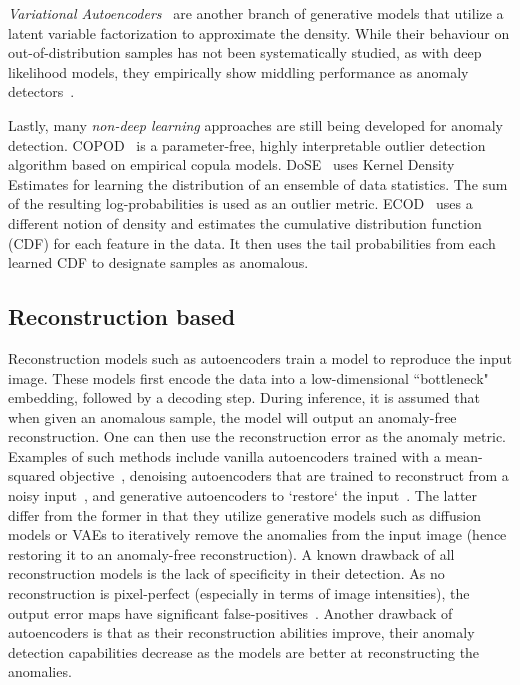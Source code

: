 \textit{Variational Autoencoders}~\cite{kingma2013auto} are another branch of generative models that utilize a latent variable factorization to approximate the density. While their behaviour on out-of-distribution samples has not been systematically studied, as with deep likelihood models, they empirically show middling performance as anomaly detectors~\cite{baur2021,kascenasRoleNoiseDenoising2023}.

Lastly, many \textit{non-deep learning} approaches are still being developed for anomaly detection. COPOD~\cite{copod} is a parameter-free, highly interpretable outlier detection algorithm based on empirical copula models. DoSE~\cite{pmlr-dose} uses Kernel Density Estimates for learning the distribution of an ensemble of data statistics. The sum of the resulting log-probabilities is used as an outlier metric. ECOD~\cite{li_ecod_2022} uses a different notion of density and estimates the cumulative distribution function (CDF) for each feature in the data. It then uses the tail probabilities from each learned CDF to designate samples as anomalous.

\subsection*{Reconstruction based}

Reconstruction models such as autoencoders train a model to reproduce the input image. These models first encode the data into a low-dimensional ``bottleneck" embedding, followed by a decoding step. During inference, it is assumed that when given an anomalous sample, the model will output an anomaly-free reconstruction. One can then use the reconstruction error as the anomaly metric. Examples of such methods include vanilla autoencoders trained with a mean-squared objective~\cite{aelu2023}, denoising autoencoders that are trained to reconstruct from a noisy input~\cite{dae-kascenas22a}, and generative autoencoders to `restore` the input~\cite{grahamDenoisingDiffusionModels2023,wyattAnoddpmAnomalyDetection2022}. The latter differ from the former in that they utilize generative models such as diffusion models or VAEs to iteratively remove the anomalies from the input image (hence restoring it to an anomaly-free reconstruction).
A known drawback of all reconstruction models is the lack of specificity in their detection. As no reconstruction is pixel-perfect (especially in terms of image intensities), the output error maps have significant false-positives~\cite{baur2021}. Another drawback of autoencoders is that as their reconstruction abilities improve, their anomaly detection capabilities decrease as the models are better at reconstructing the anomalies.

